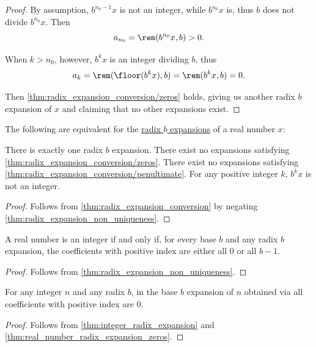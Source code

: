 \begin{proof}
  By assumption, \( b^{n_0 - 1} x \) is not an integer, while \( b^{n_0} x \) is, thus \( b \) does not divide \( b^{n_0} x \). Then
  \begin{equation*}
    a_{n_0} = \rem(b^{n_0} x, b) > 0.
  \end{equation*}

  When \( k > n_0 \), however, \( b^k x \) is an integer dividing \( b \), thus
  \begin{equation*}
    a_k = \rem(\floor(b^k x), b) = \rem(b^k x, b) = 0.
  \end{equation*}

  Then \cref{thm:radix_expansion_conversion/zeros} holds, giving us another radix \( b \) expansion of \( x \) and claiming that no other expansions exist.
\end{proof}

\begin{corollary}\label{thm:radix_expansion_uniqueness}
  The following are equivalent for the \hyperref[def:real_number_radix_expansion]{radix \( b \) expansions} of a real number \( x \):
  \begin{thmenum}
     There is exactly one radix \( b \) expansion.
     There exist no expansions satisfying \cref{thm:radix_expansion_conversion/zeros}.
     There exist no expansions satisfying \cref{thm:radix_expansion_conversion/penultimate}.
     For any positive integer \( k \), \( b^k x \) is not an integer.
  \end{thmenum}
\end{corollary}
\begin{proof}
  Follows from \cref{thm:radix_expansion_conversion} by negating \cref{thm:radix_expansion_non_uniqueness}.
\end{proof}

\begin{proposition}\label{thm:integer_radix_expansion}
  A real number is an integer if and only if, for every base \( b \) and any radix \( b \) expansion, the coefficients with positive index are either all \( 0 \) or all \( b - 1 \).
\end{proposition}
\begin{proof}
  Follows from \cref{thm:radix_expansion_non_uniqueness}.
\end{proof}

\begin{corollary}\label{thm:integer_radix_expansion_via_algorthm}
  For any integer \( n \) and any radix \( b \), in the base \( b \) expansion of \( n \) obtained via  all coefficients with positive index are \( 0 \).
\end{corollary}
\begin{proof}
  Follows from \cref{thm:integer_radix_expansion} and \cref{thm:real_number_radix_expansion_zeros}.
\end{proof}

